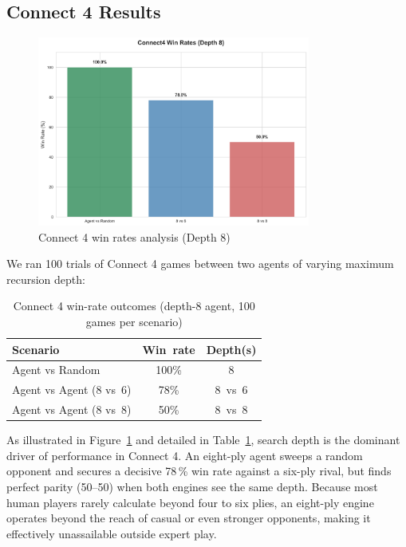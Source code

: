 \documentclass[12pt]{article}
\begin{document}
\subsection{Connect 4 Results}

\begin{figure}[H]
\centering
\includegraphics[width=0.8\textwidth]{output/images/connect4_win_rates_updated.png}
\caption{Connect 4 win rates analysis (Depth 8)}
\label{fig:connect4_win_rates}
\end{figure}

We ran 100 trials of Connect 4 games between two agents of varying maximum recursion depth:
\begin{table}[H]
    \centering
    \begin{tabular}{lcc}
        \toprule
        \textbf{Scenario} & \textbf{Win rate} & \textbf{Depth(s)} \\
        \midrule
        Agent vs Random & 100\% & 8 \\
        Agent vs Agent (8 vs 6) & 78\%  & 8 vs 6 \\
        Agent vs Agent (8 vs 8) & 50\%  & 8 vs 8 \\
        \bottomrule
    \end{tabular}
    \caption{Connect 4 win-rate outcomes (depth-8 agent, 100 games per scenario)}
    \label{tab:c4_win_rates}
\end{table}

As illustrated in Figure~\ref{fig:connect4_win_rates} and detailed in Table~\ref{tab:c4_win_rates},
search depth is the dominant driver of performance in Connect 4.
An eight-ply agent sweeps a random opponent and secures a decisive 78\,\% win rate against a six-ply rival, but finds perfect parity (50–50) when both engines see the same depth. Because most human players rarely calculate beyond four to six plies, an eight-ply engine operates beyond the reach of casual or even stronger opponents, making it effectively unassailable outside expert play.
\end{document}
